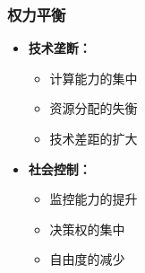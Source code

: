 \documentclass[a4paper,12pt]{ctexart}
\begin{document}
\subsubsection{权力平衡}
\begin{itemize}
    \item \textbf{技术垄断：}
        \begin{itemize}
            \item 计算能力的集中
            \item 资源分配的失衡
            \item 技术差距的扩大
        \end{itemize}
    \item \textbf{社会控制：}
        \begin{itemize}
            \item 监控能力的提升
            \item 决策权的集中
            \item 自由度的减少
        \end{itemize}
\end{itemize}
\end{document}
